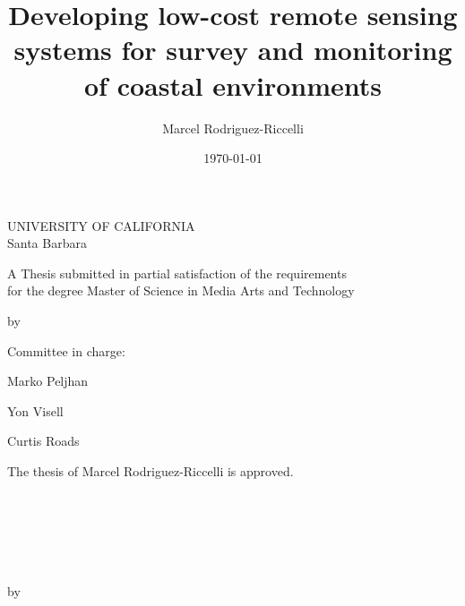 \documentclass{article}
\title{Developing low-cost remote sensing systems for survey and monitoring of coastal environments}
\author{Marcel Rodriguez-Riccelli}
\date{\today}
\begin{document}
\begin{center}
\thispagestyle{empty}
\par{UNIVERSITY OF CALIFORNIA \\[.5cm] Santa Barbara} 
\vspace{1.25cm}
\par{\huge \thetitle}
\vspace{1.5cm}
\par{A Thesis submitted in partial satisfaction of the requirements \\ for the degree Master of Science in Media Arts and Technology}
\vspace{1cm}
{by \par}
\vspace{1cm}
{\theauthor}
\vspace{1.5cm}
\par{Committee in charge:}
\vspace{1cm}
\par{Marko Peljhan}
\vspace{1cm}
\par{Yon Visell}
\vspace{1cm}
\par{Curtis Roads}
\vspace{2cm}
\par{\thedate}
\end{center}

\newpage
\thispagestyle{empty}
\begin{center}
\par{The thesis of Marcel Rodriguez-Riccelli is approved.}
\vspace{2cm}
\par{\makebox[10cm][l]{\rule{10cm}{0.4pt}}\\
}
\vspace{1cm}
\par{\makebox[10cm][l]{\rule{10cm}{0.4pt}}\\
}
\vspace{1cm}
\par{\makebox[10cm][l]{\rule{10cm}{0.4pt}}\\
}
\vspace{2cm}
\par{\thedate}
\end{center}

\newpage
{}
\thispagestyle{fancy}
\begin{center}
\par{\thetitle}
\vspace{.5cm}
{by \par}
\vspace{.5cm}
\par{\theauthor}
\vspace{.5cm}
\end{center}
\doublespacing
\end{document}

